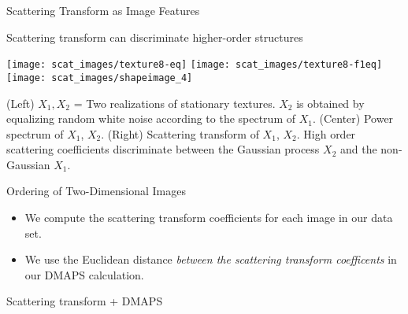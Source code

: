 \begin{frame}{Scattering Transform as Image Features}
\begin{minipage}{0.4\textwidth}
\begin{block}{{\small Scattering transform can discriminate higher-order structures \par}}
\texttt{[image: scat\_images/texture8-eq]}
\texttt{[image: scat\_images/texture8-f1eq]}
\texttt{[image: scat\_images/shapeimage\_4]}\\
{\tiny (Left) $X_1, X_2$ = Two realizations of stationary textures. $X_2$ is obtained by equalizing random white noise according to the spectrum of $X_1$. (Center) Power spectrum of $X_1$, $X_2$. (Right) Scattering transform of $X_1$, $X_2$. High order scattering coefficients discriminate between the Gaussian process $X_2$ and the non-Gaussian $X_1$. \par}
\end{block}

\end{minipage}

\end{frame}

\begin{frame}{Ordering of Two-Dimensional Images}

	{\small 
	\begin{itemize}
		\item We compute the scattering transform coefficients for each image in our data set.
		\item We use the Euclidean distance {\em between the scattering transform coefficents} in our DMAPS calculation.
	\end{itemize}
    \par}

	\vspace{0.1in}
	
	\drawunordered
    
    	\drawdownarrow 
    	
    \begin{minipage}{0.5\textwidth}
    \centering
	{\scriptsize Scattering transform + DMAPS \par}
    \end{minipage}\\
    \drawdownarrow
    
	\draworderedscat 
    
\end{frame}

    
    

    